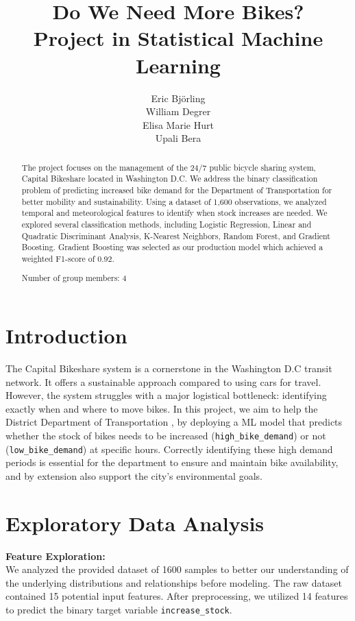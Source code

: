 \documentclass{article}
\title{Do We Need More Bikes?\\
Project in Statistical Machine Learning}
\author{
  Eric Björling\\
  \AND
  William Degrer\\
  \AND
  Elisa Marie Hurt\\
  \AND
  Upali Bera\\
}
\begin{document}
\maketitle

\begin{abstract}
 The project focuses on the management of the 24/7 public bicycle sharing system, Capital Bikeshare located in Washington D.C. We address the binary classification problem of predicting increased bike demand for the Department of Transportation for better mobility and sustainability. Using a dataset of 1,600 observations, we analyzed temporal and meteorological features to identify when stock increases are needed. We explored several classification methods, including Logistic Regression, Linear and Quadratic Discriminant Analysis, K-Nearest Neighbors, Random Forest, and Gradient Boosting. Gradient Boosting was selected as our production model which achieved a weighted F1-score of 0.92.
  
Number of group members: 4
\end{abstract}

\section{Introduction}

The Capital Bikeshare system is a cornerstone in the Washington D.C transit network. It offers a sustainable approach compared to using cars for travel. However, the system struggles with a major logistical bottleneck: identifying exactly when and where to move bikes. In this project, we aim to help the District Department of Transportation \cite{uu_course}, by deploying a ML model that predicts whether the stock of bikes needs to be increased (\texttt{high\_bike\_demand}) or not (\texttt{low\_bike\_demand}) at specific hours. Correctly identifying these high demand periods is essential for the department to ensure and maintain bike availability, and by extension also support the city's environmental goals.

\section{Exploratory Data Analysis}

\textbf{Feature Exploration:} \\ We analyzed the provided dataset of 1600 samples to better our understanding of the underlying distributions and relationships before modeling. The raw dataset contained 15 potential input features. After preprocessing, we utilized 14 features to predict the binary target variable \texttt{increase\_stock}.
\end{document}
